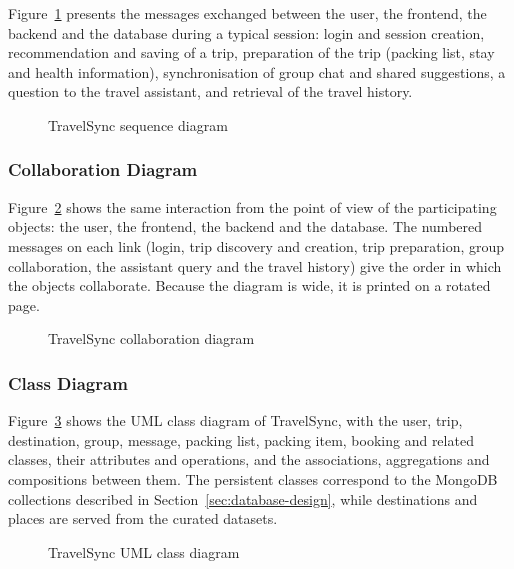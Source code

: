 Figure~\ref{fig:sequence} presents the messages exchanged between the user,
the frontend, the backend and the database during a typical session: login
and session creation, recommendation and saving of a trip, preparation of
the trip (packing list, stay and health information), synchronisation of
group chat and shared suggestions, a question to the travel assistant, and
retrieval of the travel history.

\begin{figure}[htbp]
  \centering
  \caption{TravelSync sequence diagram}
  \label{fig:sequence}
\end{figure}

\subsubsection{Collaboration Diagram}

Figure~\ref{fig:collaboration} shows the same interaction from the point of
view of the participating objects: the user, the frontend, the backend and
the database. The numbered messages on each link (login, trip discovery and
creation, trip preparation, group collaboration, the assistant query and the
travel history) give the order in which the objects collaborate. Because the
diagram is wide, it is printed on a rotated page.

\begin{figure}
  \centering
  \caption{TravelSync collaboration diagram}
  \label{fig:collaboration}
\end{figure}

\subsubsection{Class Diagram}

Figure~\ref{fig:class} shows the UML class diagram of TravelSync, with the
user, trip, destination, group, message, packing list, packing item, booking
and related classes, their attributes and operations, and the associations,
aggregations and compositions between them. The persistent classes
correspond to the MongoDB collections described in
Section~\ref{sec:database-design}, while destinations and places are served
from the curated datasets.

\begin{figure}
  \centering
  \caption{TravelSync UML class diagram}
  \label{fig:class}
\end{figure}

